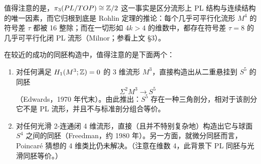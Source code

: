 值得注意的是，$\pi_{3}(PL/TOP)\cong\mathbb{Z}/2$ 这一事实是区分流形上 PL 结构与连续结构的唯一因素，而它归根到底是 Rohlin 定理的推论：每个几乎可平行化流形 $M^{4}$ 的符号差 $\tau$ 都被 16 整除；而在一切形如 $4k>4$ 的维数中，都存在符号差 $\tau=8$ 的几乎可平行化闭 PL 流形（Milnor；参看上文 §3）。%

在较近的成功的同胚构造中，值得注意的是下面两个：
\begin{enumerate}[label=\arabic*.,leftmargin=2.2em,itemsep=2pt,topsep=2pt]
  \item 对任何满足 $H_{1}(M^{3};\mathbb{Z})=0$ 的 3 维流形 $M^{3}$，直接构造出从二重悬挂到 $S^{5}$ 的同胚
  \[
  \Sigma^{2}M^{3}\to S^{5}
  \]
  （Edwards，1970 年代末）。由此推出：$S^{5}$ 存在一种三角剖分，相对于该剖分它不是 PL 流形，并且不与标准剖分组合等价。
  \item 对任何光滑 2-连通闭 4 维流形，直接（且并不特别复杂地）构造出它与球面 $S^{4}$ 之间的同胚（Freedman，约 1980 年）。另一方面，就微分同胚而言，Poincaré 猜想的 4 维类比仍未解决。（注意在维数 4，此背景下 PL 同胚与光滑同胚等价。）
\end{enumerate}

